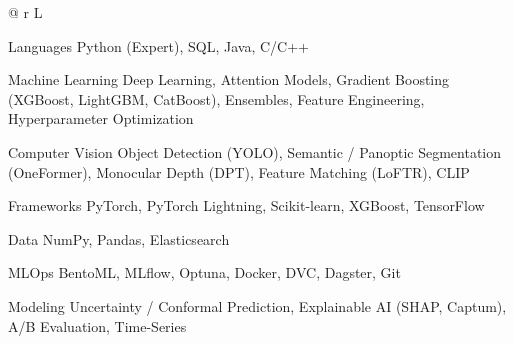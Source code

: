 


\renewenvironment{cvskills}{%
  \vspace{\acvSectionContentTopSkip}
  \vspace{-2.0mm}
  \begin{center}
    \setlength\tabcolsep{1ex}
    \setlength{\extrarowheight}{0pt}
    \begin{tabular*}{\textwidth}{@{\extracolsep{\fill}} r L{\textwidth * }}
}{%
    \end{tabular*}
  \end{center}
}

\begin{cvskills}

  \cvskill
    {Languages} %
    {Python (Expert), SQL, Java, C/C++} %

  \cvskill
    {Machine Learning} %
    {Deep Learning, Attention Models, Gradient Boosting (XGBoost, LightGBM, CatBoost), Ensembles, Feature Engineering, Hyperparameter Optimization} %

  \cvskill
    {Computer Vision} %
    {Object Detection (YOLO), Semantic / Panoptic Segmentation (OneFormer), Monocular Depth (DPT), Feature Matching (LoFTR), CLIP} %

  \cvskill
    {Frameworks} %
    {PyTorch, PyTorch Lightning, Scikit-learn, XGBoost, TensorFlow} %

  \cvskill
    {Data} %
    {NumPy, Pandas, Elasticsearch} %

  \cvskill
    {MLOps} %
    {BentoML, MLflow, Optuna, Docker, DVC, Dagster, Git} %

  \cvskill
    {Modeling} %
    {Uncertainty / Conformal Prediction, Explainable AI (SHAP, Captum), A/B Evaluation, Time-Series} %

\end{cvskills}
